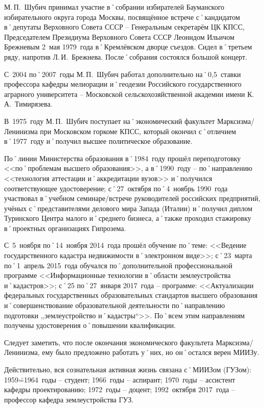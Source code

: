 М.\,П.~Шубич принимал участие в˚собрании избирателей Бауманского избирательного округа города Москвы, посвящённое встрече с˚кандидатом в˚депутаты Верховного Совета СССР \--- Генеральным секретарём ЦК КПСС, Председателем Президиума Верховного Совета СССР Леонидом Ильичом Брежневым 2~мая 1979~года в˚Кремлёвском дворце съездов. Сидел в˚третьем ряду, напротив Л.\,И.~Брежнева. После˚собрания состоялся большой концерт. 

С~2004 по˚2007~годы М.\,П.~Шубич работал дополнительно на˚0,5~ставки профессора кафедры мелиорации и˚геодезии Российского государственного аграрного университета \--- Московской сельскохозяйственной академии имени К.\,А.~Тимирязева.

В~1975~году М.\,П.~Шубич поступает на˚экономический факультет Марксизма\-/Ленинизма при Московском горкоме КПСС, который окончил с˚отличием в˚1977~году и˚получил высшее политическое образование.

По˚линии Министерства образования в˚1984~году прошёл переподготовку <<по˚проблемам высшего образования>>, а в˚1990~году \--- по˚направлению <<технология аттестации и˚аккредитации вузов>> и˚получился соответствующее удостоверение; с˚27~октября по˚4~ноябрь 1990~года участвовал в˚учебном семинаре\-/встрече руководителей российских предприятий, учёных с˚представителями делового мира Запада (Италии) и˚получил диплом Туринского Центра малого и˚среднего бизнеса, а˚также проходил стажировку в˚проектных организациях Гипрозема.

С~5~ноября по˚14~ноября 2014~года прошёл обучение по˚теме: <<Ведение государственного кадастра недвижимости в˚электронном виде>>; с˚23~марта по˚1~апрель 2015~года обучался по˚дополнительной профессиональной программе <<Информационные технологии в˚области землеустройства и˚кадастров>>; с˚25 по˚27~января 2017~года \--- программе: <<Актуализации федеральных государственных образовательных стандартов высшего образования и˚совершенствование образовательной деятельности по˚направлению подготовки ,,землеустройство и˚кадастры``>>. По˚всем этим направлениям получены удостоверения о˚повышении квалификации. 

Следует заметить, что после окончания экономического факультета Марксизма\-/Ленинизма, ему было предложено работать у˚них, но он˚остался верен МИИЗу.

Действительно, вся сознательная активная жизнь связана с˚МИИЗом (ГУЗом): 1959\==1964~годы \--- студент; 1966~годы \--- аспирант; 1970~годы \--- ассистент кафедры проектированию; 1972~годы \--- доцент; 1992~октября 2017~года \--- профессор кафедра землеустройства ГУЗ.


